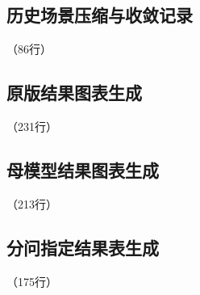 
\label{code:source:15:end}


\subsection{历史场景压缩与收敛记录}

\label{code:source:16}

{\small\noindent{}\quad（86行）\par}


\label{code:source:16:end}


\subsection{原版结果图表生成}

\label{code:source:17}

{\small\noindent{}\quad（231行）\par}


\label{code:source:17:end}


\subsection{母模型结果图表生成}

\label{code:source:18}

{\small\noindent{}\quad（213行）\par}


\label{code:source:18:end}


\subsection{分问指定结果表生成}

\label{code:source:19}

{\small\noindent{}\quad（175行）\par}

